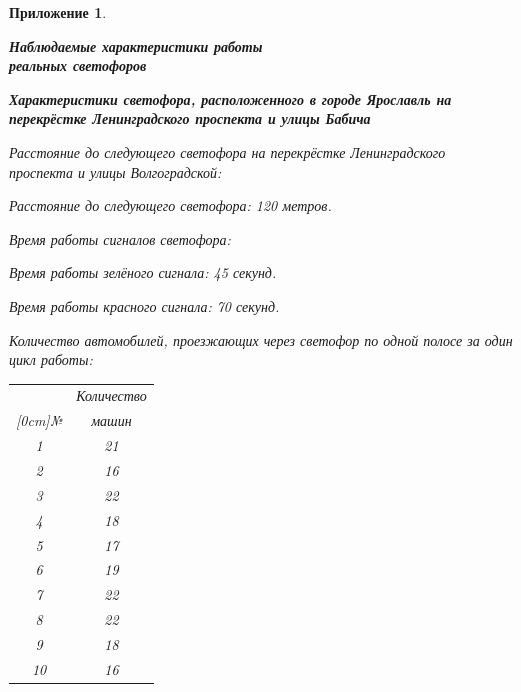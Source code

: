 \documentclass[12pt, a4paper]{extarticle}
\numberwithin{equation}{section}
\newtheorem{attachment}{\hspace{12cm}  Приложение}
\numberwithin{figure}{section}
\begin{document}
\begin{attachment} \label{att}
	\begin{center}
		\vspace{1cm}
		\rm{\Large{\textbf{ Наблюдаемые характеристики работы \\ реальных светофоров }}}
		\vspace{\baselineskip}
	\end{center}

\textup{\textbf{Характеристики светофора, расположенного в городе Ярославль на перекрёстке Ленинградского проспекта и улицы Бабича }}
\newline

\noindent\textup{Расстояние до следующего светофора на перекрёстке Ленинградского проспекта и улицы Волгоградской:}

Расстояние до следующего светофора: 120 метров.

\noindent\textup{Время работы сигналов светофора:}

Время работы зелёного сигнала: 45 секунд.
			
Время работы красного сигнала: 70 секунд.

\noindent\textup{Количество автомобилей, проезжающих через светофор по одной полосе за один цикл работы:}
	
\begin{table}[h!]
	\begin{minipage}{0.23\linewidth}
		
		\centering
		\begin{tabular}{|c|c|}
			\hline
			 & Количество \\ 
			 \raisebox{1.5ex}[0cm]{№}
			 & машин 
			\\\hline
			1 & 21
			\\\hline
			2 & 16
			\\\hline
			3 & 22
			\\\hline
			4 & 18
			\\\hline
			5 & 17
			\\\hline
			6 & 19
			\\\hline
			7 & 22
			\\\hline
			8 & 22
			\\\hline
			9 & 18
			\\\hline
			10 & 16
			\\\hline
		\end{tabular}
	\end{minipage}
	\begin{minipage}{0.23\linewidth}
		\centering
		

\end{minipage}
\end{table}
\end{attachment}
\end{document}
